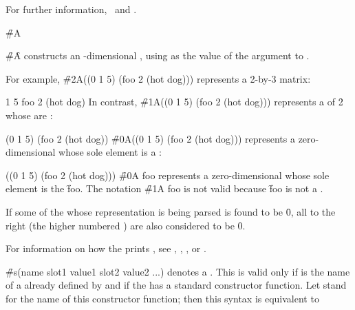 For further information, 
\seesection\PrintingComplexes\ and \secref\SyntaxOfComplexes.

\endsubsubsection%


\f{\#A}

\f{\#\f{A}} constructs an -dimensional ,
using  as the value of the  argument
to .

For example, \f{\#2A((0 1 5) (foo 2 (hot dog)))} represents a 2-by-3 matrix:

       1       5
 foo     2       (hot dog)
\endcode
In contrast, \f{\#1A((0 1 5) (foo 2 (hot dog)))} 
represents a  of  \f{2} 
whose  are :

\code
 (0 1 5) (foo 2 (hot dog))
\endcode
\f{\#0A((0 1 5) (foo 2 (hot dog)))} represents a zero-dimensional
 whose sole element is a :

\code
 ((0 1 5) (foo 2 (hot dog)))
\endcode
\f{\#0A foo} represents 
a zero-dimensional  whose sole element is the 
 \f{foo}.
The notation \f{\#1A foo} is not valid because \f{foo} is
not a .

If some  of the 
whose representation is being parsed is found to be \f{0},
all  to the right 
(\ie the higher numbered )
are also considered to be \f{0}.

For information on how the  prints ,
see \secref\PrintingStrings,
    \secref\PrintingBitVectors,
    \secref\PrintingOtherVectors,
 or \secref\PrintingOtherArrays.

\endsubsubsection%



\f{\#s(name slot1 value1 slot2 value2 ...)}
denotes a .  This is valid only if  is the name
of a   already defined by  
and if the   has a standard constructor function.
Let  stand for the name of this constructor function;
then this syntax is equivalent to

